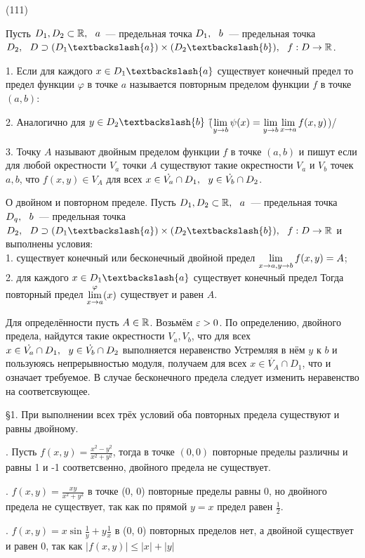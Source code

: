 (111)

\Op  Пусть $D_1, D_2 \subset\mathbb{R},\ \  a$~--- предельная точка $D_1,\ \  b$~--- предельная точка $D_2,\s D \supset (D_1 \bsl\{a\}) \times (D_2 \bsl\{b\}),\s f: D \to \R$.

1. Если для каждого $x \in D_1 \bsl\{a\}$ существует конечный предел
 то предел функции $\varphi$ в точке $a$ называется повторным пределом функции $f$ в точке $(a, b)$: 

2. Аналогично для $y \in D_2 \bsl \{b\}$ \f($\displaystyle \lim\limits^{}_{y\to b} \psi(x) = \displaystyle \lim\limits^{}_{y\to b} \displaystyle \lim\limits^{}_{x\to a} f(x, y)$)/

3. Точку $A$ называют двойным пределом функции $f$ в точке $(a, b)$ и пишут  если для любой окрестности $V_a$ точки $A$ существуют такие окрестности $V_a$ и $V_b$ точек $a, b$, что $f(x, y) \in V_A$ для всех $x \in \dot{V_a}\cap D_1,\ \  y \in \dot{V_b}\cap D_2$.

\T \q О двойном и повторном пределе. Пусть $D_1, D_2 \subset \mathbb{R},\ \  a$~--- предельная точка $D_q,\ \  b$~--- предельная точка $D_2,\s D \supset (D_1 \bsl\{a\}) \times (D_2 \bsl\{b\}),\s f: D \to \R$ и выполнены условия:\\
1. существует конечный или бесконечный двойной предел $\displaystyle \lim\limits^{}_{x\to a,y\to b} f(x,y) = A$;\\
2. для каждого $x \in D_1 \bsl\{a\}$ существует конечный предел  Тогда повторный предел $\displaystyle \lim\limits^{\varphi}_{x\to a}(x)$ существует и равен $A$.

\D Для определённости пусть $A \in \mathbb{R}$. Возьмём $\varepsilon > 0$. По определению, двойного предела, найдутся такие окрестности $V_a, V_b$, что для всех $x \in \dot{V_a}\cap D_1,\ \  y \in \dot{V_b}\cap D_2$ выполняется неравенство  Устремляя в нём $y$ к $b$ и пользуюясь непрерывностью модуля, получаем  для всех $x \in \dot{V_A}\cap D_1$, что и означает требуемое. В случае бесконечного предела следует изменить неравенство на соответсвующее.

\S1. При выполнении всех трёх условий оба повторных предела существуют и равны двойному.

. Пусть $f(x, y) = \frac{x^2 - y^2}{x^2 + y^2}$, тогда в точке $(0, 0)$ повторные пределы различны и равны 1 и -1 соответсвенно, двойного предела не существует.

. $f(x, y) = \frac{xy}{x^2 + y^2}$ в точке (0, 0) повторные пределы равны 0, но двойного предела не существует, так как по прямой $y = x$ предел равен $\frac 12$.

. $f(x, y) = x\sin\frac 1y + y\frac 1x$ в (0, 0) повторных пределов нет, а двойной существует и равен 0, так как $|f(x, y)| \le |x| + |y|$